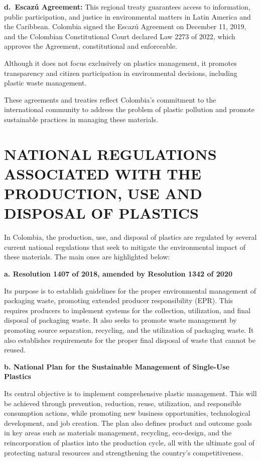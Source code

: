 \documentclass[
  12pt,
  oneside]{book}
\begin{document}
\textbf{d.~Escazú Agreement:} This regional treaty guarantees access to
information, public participation, and justice in environmental matters
in Latin America and the Caribbean. Colombia signed the Escazú Agreement
on December 11, 2019, and the Colombian Constitutional Court declared
Law 2273 of 2022, which approves the Agreement, constitutional and
enforceable.

Although it does not focus exclusively on plastics management, it
promotes transparency and citizen participation in environmental
decisions, including plastic waste management.

These agreements and treaties reflect Colombia's commitment to the
international community to address the problem of plastic pollution and
promote sustainable practices in managing these materials.

\section{NATIONAL REGULATIONS ASSOCIATED WITH THE PRODUCTION, USE AND
DISPOSAL OF
PLASTICS}\label{national-regulations-associated-with-the-production-use-and-disposal-of-plastics-2}

In Colombia, the production, use, and disposal of plastics are regulated
by several current national regulations that seek to mitigate the
environmental impact of these materials. The main ones are highlighted
below:

\textbf{a. Resolution 1407 of 2018, amended by Resolution 1342 of 2020 }

Its purpose is to establish guidelines for the proper environmental
management of packaging waste, promoting extended producer
responsibility (EPR). This requires producers to implement systems for
the collection, utilization, and final disposal of packaging waste. It
also seeks to promote waste management by promoting source separation,
recycling, and the utilization of packaging waste. It also establishes
requirements for the proper final disposal of waste that cannot be
reused.

\textbf{b. National Plan for the Sustainable Management of Single-Use
Plastics }

Its central objective is to implement comprehensive plastic management.
This will be achieved through prevention, reduction, reuse, utilization,
and responsible consumption actions, while promoting new business
opportunities, technological development, and job creation. The plan
also defines product and outcome goals in key areas such as materials
management, recycling, eco-design, and the reincorporation of plastics
into the production cycle, all with the ultimate goal of protecting
natural resources and strengthening the country's competitiveness.
\end{document}
